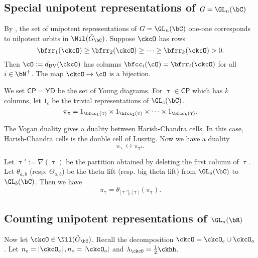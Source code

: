 \documentclass[12pt,a4paper]{amsart}
\def\abs#1{\left|{#1}\right|}
\newcommand{\CP}{{\mathcal {P}}}
\def\DD{\nabla}
\numberwithin{equation}{section}
\theoremstyle{remark}
\def\half{{\tfrac{1}{2}}}
\def\ckGc{\check{G}_{\bC}}
\def\dBV{d_{\mathrm{BV}}}
\def\CP{\mathsf{CP}}
\def\YD{\mathsf{YD}}
\def\DD{\nabla}
\begin{document}
\subsection{Special unipotent representations of $G = \GL_n(\bC)$}
By \cite{BVUni}, the set of unipotent representations
of $G = \GL_n(\bC)$ one-one corresponds to nilpotent orbits in $\Nil(\ckGc)$. 
Suppose $\ckcO$ has rows 
\[
\bfrr_1(\ckcO)\geq \bfrr_2(\ckcO)\geq \cdots\geq 
\bfrr_k(\ckcO) >0. 
\]
Then $\cO := \dBV(\ckcO)$ has columns $\bfcc_i(\cO) = \bfrr_i(\ckcO)$ for all 
$i\in \bN^+$. 
The map $\ckcO \mapsto \cO$ is a bijection.


We set $\CP =  \YD$ be the set of Young diagrams. 
For $\uptau \in \CP$ which has $k$ columns,
let $1_{c}$ be the trivial representations of $\GL_c(\bC)$. 
\[
 \pi_\uptau = 1_{\bfcc_1(\uptau)}\times  1_{\bfcc_2(\uptau)}\times \cdots 
 \times 1_{\bfcc_k(\uptau)}.
\]

The Vogan duality gives a duality between Harish-Chandra cells. 
In this case, Harish-Chandra cells is the double cell  
of Lusztig.  
Now we have a duality 
\[
 \pi_\uptau \leftrightarrow \pi_{\uptau^t}. 
\]

Let $\uptau' := \DD(\uptau)$ be the partition obtained by deleting the first column 
of $\uptau$. 
Let $\theta_{a,b}$ (resp. $\Theta_{a,b}$) be the  theta lift (resp. big theta lift) from $\GL_a(\bC)$ to  
$\GL_b(\bC)$. 
Then we have 
\[
  \pi_{\uptau} = \theta_{{\abs{\uptau'}},{\abs{\uptau}}} (\pi_{\uptau}). 
\]

\subsection{Counting unipotent representations of $\GL_n(\bR)$}
Now let $\ckcO\in \Nil(\ckGc)$. 
Recall the decomposition $\ckcO  = \ckcO_e \cup \ckcO_o$.
Let $n_e = \abs{\ckcO_e}, n_o = \abs{\ckcO_o}$ and $\lambda_\ckcO = \half \ckhh$. 
\end{document}
